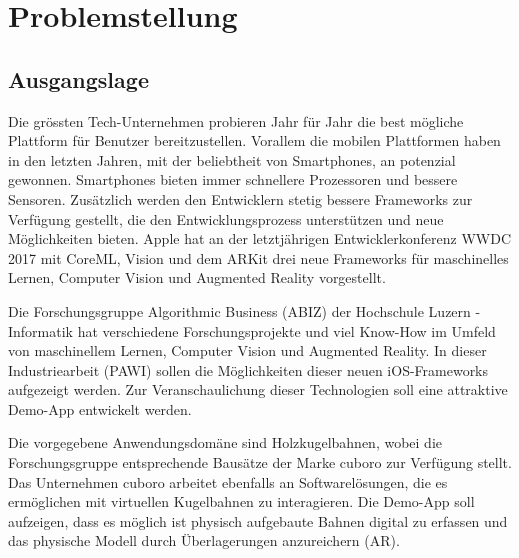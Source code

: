\section{Problemstellung}

\subsection{Ausgangslage}


Die grössten Tech-Unternehmen probieren Jahr für Jahr die best mögliche Plattform für Benutzer bereitzustellen. Vorallem die mobilen Plattformen haben in den letzten Jahren, mit der beliebtheit von Smartphones, an potenzial gewonnen. Smartphones bieten immer schnellere Prozessoren und bessere Sensoren. Zusätzlich werden den Entwicklern stetig bessere Frameworks zur Verfügung gestellt, die den Entwicklungsprozess unterstützen und neue Möglichkeiten bieten. Apple hat an der letztjährigen Entwicklerkonferenz WWDC 2017 mit CoreML, Vision und dem ARKit drei neue Frameworks für maschinelles Lernen, Computer Vision und Augmented Reality vorgestellt.


Die Forschungsgruppe Algorithmic Business (ABIZ) der Hochschule Luzern - Informatik hat verschiedene Forschungsprojekte und viel Know-How im Umfeld von maschinellem Lernen, Computer Vision und Augmented Reality. In dieser Industriearbeit (PAWI) sollen die Möglichkeiten dieser neuen iOS-Frameworks aufgezeigt werden. Zur Veranschaulichung dieser Technologien soll eine attraktive Demo-App entwickelt werden. 


Die vorgegebene Anwendungsdomäne sind Holzkugelbahnen, wobei die Forschungsgruppe entsprechende Bausätze der Marke cuboro zur Verfügung stellt. Das Unternehmen cuboro arbeitet ebenfalls an Softwarelösungen, die es ermöglichen mit virtuellen Kugelbahnen zu interagieren. Die Demo-App soll aufzeigen, dass es möglich ist physisch aufgebaute Bahnen digital zu erfassen und das physische Modell durch Überlagerungen anzureichern (AR).

